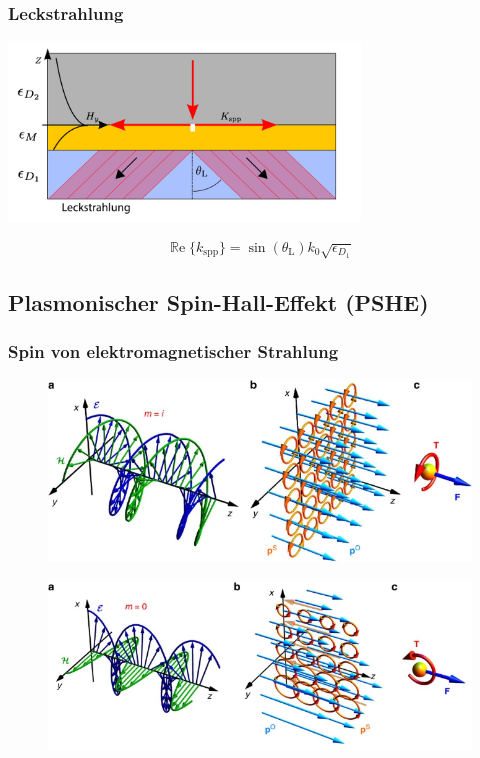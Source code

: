 \documentclass[aspectratio=1610]{beamer}
\renewcommand{\Re}{\operatorname{\mathbb{R}e}}
\begin{document}
		\begin{frame}
			\frametitle{Leckstrahlung}
				\begin{center}
					\includegraphics[width=0.7\textwidth]{figures/leckstrahlung.pdf}
				\end{center}
			\begin{equation}
				\boxed{\Re\{k_{\mathrm{spp}}\}=\sin(\theta_\mathrm{L}) k_0 \sqrt{\epsilon_{D_1}}}
			\end{equation}
		\end{frame}	
		
	
	

		\subsection{Plasmonischer Spin-Hall-Effekt (PSHE)}
			\begin{frame}
				\frametitle{Spin von elektromagnetischer Strahlung}
				\begin{figure}[h]
					\centering
					\includegraphics[width=0.7\linewidth]{figures/spin/prop_spin}
				\end{figure}
				\begin{figure}[h]
					\centering
					\includegraphics[width=0.7\linewidth]{figures/spin/ev_spin}
				\end{figure}				
			\end{frame}
		
\end{document}
